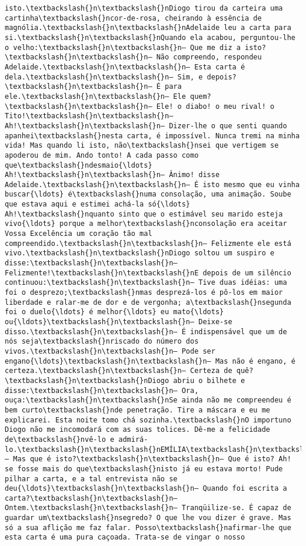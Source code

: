 \begin{Verbatim}[commandchars=\\\{\}]
isto.\textbackslash{}n\textbackslash{}nDiogo tirou da carteira uma cartinha\textbackslash{}ncor-de-rosa, cheirando à essência de magnólia.\textbackslash{}n\textbackslash{}nAdelaide leu a carta para si.\textbackslash{}n\textbackslash{}nQuando ela acabou, perguntou-lhe o velho:\textbackslash{}n\textbackslash{}n— Que me diz a isto?\textbackslash{}n\textbackslash{}n— Não compreendo, respondeu Adelaide.\textbackslash{}n\textbackslash{}n— Esta carta é dela.\textbackslash{}n\textbackslash{}n— Sim, e depois?\textbackslash{}n\textbackslash{}n— É para ele.\textbackslash{}n\textbackslash{}n— Ele quem?\textbackslash{}n\textbackslash{}n— Ele! o diabo! o meu rival! o Tito!\textbackslash{}n\textbackslash{}n— Ah!\textbackslash{}n\textbackslash{}n— Dizer-lhe o que senti quando apanhei\textbackslash{}nesta carta, é impossível. Nunca tremi na minha vida! Mas quando li isto, não\textbackslash{}nsei que vertigem se apoderou de mim. Ando tonto! A cada passo como que\textbackslash{}ndesmaio{\ldots} Ah!\textbackslash{}n\textbackslash{}n— Ânimo! disse Adelaide.\textbackslash{}n\textbackslash{}n— É isto mesmo que eu vinha buscar{\ldots} é\textbackslash{}numa consolação, uma animação. Soube que estava aqui e estimei achá-la só{\ldots} Ah!\textbackslash{}nquanto sinto que o estimável seu marido esteja vivo{\ldots} porque a melhor\textbackslash{}nconsolação era aceitar Vossa Excelência um coração tão mal compreendido.\textbackslash{}n\textbackslash{}n— Felizmente ele está vivo.\textbackslash{}n\textbackslash{}nDiogo soltou um suspiro e disse:\textbackslash{}n\textbackslash{}n— Felizmente!\textbackslash{}n\textbackslash{}nE depois de um silêncio continuou:\textbackslash{}n\textbackslash{}n— Tive duas idéias: uma foi o desprezo;\textbackslash{}nmas desprezá-los é pô-los em maior liberdade e ralar-me de dor e de vergonha; a\textbackslash{}nsegunda foi o duelo{\ldots} é melhor{\ldots} eu mato{\ldots} ou{\ldots}\textbackslash{}n\textbackslash{}n— Deixe-se disso.\textbackslash{}n\textbackslash{}n— É indispensável que um de nós seja\textbackslash{}nriscado do número dos vivos.\textbackslash{}n\textbackslash{}n— Pode ser engano{\ldots}\textbackslash{}n\textbackslash{}n— Mas não é engano, é certeza.\textbackslash{}n\textbackslash{}n— Certeza de quê?\textbackslash{}n\textbackslash{}nDiogo abriu o bilhete e disse:\textbackslash{}n\textbackslash{}n— Ora, ouça:\textbackslash{}n\textbackslash{}nSe ainda não me compreendeu é bem curto\textbackslash{}nde penetração. Tire a máscara e eu me explicarei. Esta noite tomo chá sozinha.\textbackslash{}nO importuno Diogo não me incomodará com as suas tolices. Dê-me a felicidade de\textbackslash{}nvê-lo e admirá-lo.\textbackslash{}n\textbackslash{}nEMÍLIA\textbackslash{}n\textbackslash{}n— Mas que é isto?\textbackslash{}n\textbackslash{}n— Que é isto? Ah! se fosse mais do que\textbackslash{}nisto já eu estava morto! Pude pilhar a carta, e a tal entrevista não se deu{\ldots}\textbackslash{}n\textbackslash{}n— Quando foi escrita a carta?\textbackslash{}n\textbackslash{}n— Ontem.\textbackslash{}n\textbackslash{}n— Tranqüilize-se. É capaz de guardar um\textbackslash{}nsegredo? O que lhe vou dizer é grave. Mas só a sua aflição me faz falar. Posso\textbackslash{}nafirmar-lhe que esta carta é uma pura caçoada. Trata-se de vingar o nosso 
\end{Verbatim}
